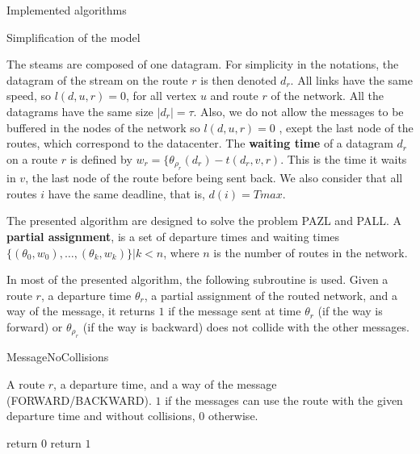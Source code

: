 \documentclass[10pt]{article}
\begin{document}
  \begin{section}{Implemented algorithms}
  
  \begin{subsection}{Simplification of the model}
 
   The steams are composed of one datagram. For simplicity in the notations, the datagram of the stream on the route $r$ is then denoted $d_r$. All links have the same speed, so $l(d,u,r)=0$, for all vertex $u$ and route $r$ of the network. All the datagrams have the same size $|d_r| = \tau$.
   Also, we do not allow the messages to be buffered in the nodes of the network so $l(d,u,r)=0$ , exept the last node of the routes, which correspond to the datacenter.
   The \textbf{waiting time} of a datagram $d_r$ on a route $r$ is defined by $w_r = \{\theta_{\rho_r}(d_r) - t(d_r,v,r)$. This is the time it waits in $v$, the last node of the route before being sent back.
   We also consider that all routes $i$ have the same deadline, that is,  $d(i)= Tmax$.
   
  \end{subsection}

  The presented algorithm are designed to solve the problem PAZL and PALL.
  A \textbf{partial assignment}, is a set of departure times and waiting times $\{(\theta_0,w_0),\ldots,(\theta_k,w_k)\}|k<n$, where $n$ is the number of routes in the network.
  
   
   
  In most of the presented algorithm, the following subroutine is used. Given a route $r$, a departure time $\theta_r$, a partial assignment of the routed network, and a way of the message, it returns $1$ if the message sent at time $\theta_r$ (if the way is forward) or $\theta_{\rho_r}$ (if the way is backward)  does not collide with the other messages. 
   	\begin{algorithm}[H]
 	\caption{MessageNoCollisions}
	\label{algo:messagenocollisions}
 	\begin{algorithmic}
 	\REQUIRE A route $r$, a departure time, and a way of the message (FORWARD/BACKWARD).
	\ENSURE $1$ if the messages can use the route with the given departure time and without collisions, $0$ otherwise.

 	\STATE return $0$
 	\ENDIF
 	\ENDFOR
	\STATE return $1$
 	\end{algorithmic}
 	\end{algorithm}
 	

\end{section}
\end{document}
